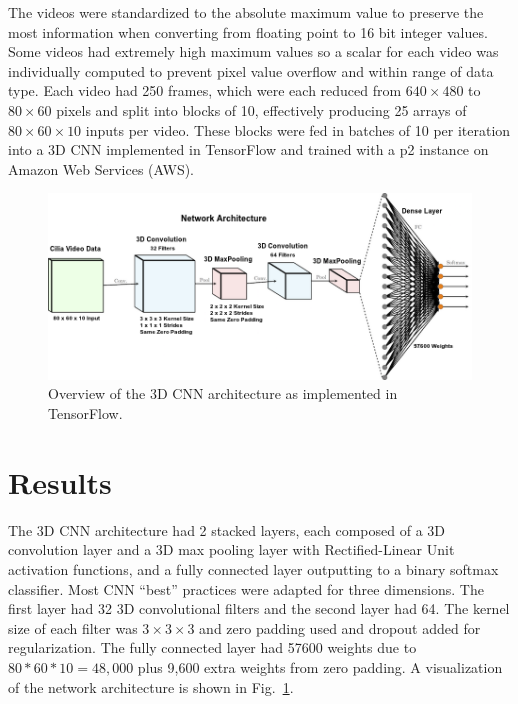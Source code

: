 The videos were standardized to the absolute maximum value to preserve the most information when converting from floating point to 16 bit integer values. Some videos had extremely high maximum values so a scalar for each video was individually computed to prevent pixel value overflow and within range of data type. Each video had 250 frames, which were each reduced from $640 \times 480$ to $80 \times 60$ pixels and split into blocks of 10, effectively producing 25 arrays of $80 \times 60 \times 10$ inputs per video. These blocks were fed in batches of 10 per iteration into a 3D CNN implemented in TensorFlow and trained with a p2 instance on Amazon Web Services (AWS). 

\begin{figure}
\includegraphics[scale=1.2]{arch}
\caption{Overview of the 3D CNN architecture as implemented in TensorFlow.}
\label{fig:cnn}
\end{figure}

\section{Results}

The 3D CNN architecture had 2 stacked layers, each composed of a 3D convolution layer and a 3D max pooling layer with Rectified-Linear Unit \cite{nair2010rectified} activation functions, and a fully connected layer outputting to a binary softmax classifier. Most CNN ``best'' practices \cite{goodfellow_bengio_courville_2016} were adapted for three dimensions. The first layer had 32 3D convolutional filters and the second layer had 64. The kernel size of each filter was $3 \times 3 \times 3$ and zero padding used and dropout \cite{srivastava2014dropout} added for regularization. The fully connected layer had 57600 weights due to $80 * 60 * 10 = 48,000$ plus 9,600 extra weights from zero padding. A visualization of the network architecture is shown in Fig.~\ref{fig:cnn}.

